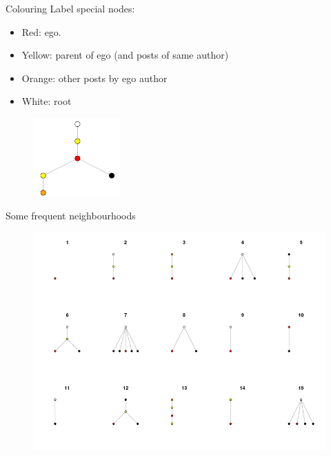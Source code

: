 \documentclass{beamer}
\begin{document}
\begin{frame}{Colouring}
Label special nodes:
\begin{itemize}
	\item Red: ego.
	\item Yellow: parent of ego (and posts of same author)
	\item Orange: other posts by ego author
	\item White: root
\end{itemize}
	\begin{figure}
		\centering
		\includegraphics[width=0.3\textwidth]{colouring}
	\end{figure}

\end{frame}
\begin{frame}{Some frequent neighbourhoods}{}
	\begin{figure}
		\centering
		\includegraphics[width=1\textwidth]{dictionary1}
	\end{figure}
\end{frame}
\end{document}
